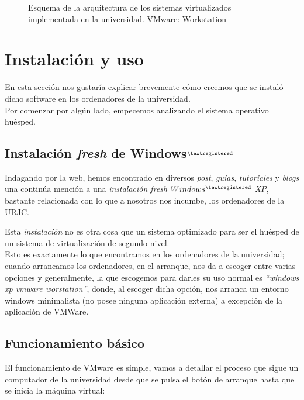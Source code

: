 \begin{figure}[H]
\begin{center}
\end{center}
\caption[Arquitectura VMware: Workstation]{Esquema de la arquitectura de los sistemas virtualizados implementada en la universidad. VMware: Workstation}
\end{figure}

\section{Instalación y uso}
En esta sección nos gustaría explicar brevemente cómo creemos que se instaló dicho software en los ordenadores de la universidad.\\

Por comenzar por algún lado, empecemos analizando el sistema operativo huésped\cite{vmwareinst}\cite{vmwareinst2}.\\

\subsection{Instalación \emph{fresh} de Windows$^{\textregistered}$}
Indagando por la web, hemos encontrado en diversos \emph{post}, \emph{guías}, \emph{tutoriales} y \emph{blogs} una continúa mención a una \emph{instalación fresh $Windows^{\textregistered}$ XP}, bastante relacionada con lo que a nosotros nos incumbe, los ordenadores de la URJC.

Esta \emph{instalación} no es otra cosa que un sistema optimizado para ser el huésped de un sistema de virtualización de segundo nivel.\\

Esto es exactamente lo que encontramos en los ordenadores de la universidad; cuando arrancamos los ordenadores, en el arranque, nos da a escoger entre varias opciones y generalmente, la que escogemos para darles su uso normal es \emph{\textquotedblleft windows xp vmware worstation\textquotedblright}, donde, al escoger dicha opción, nos arranca un entorno windows minimalista (no posee ninguna aplicación externa) a excepción de la aplicación de VMWare.

\subsection{Funcionamiento básico}

El funcionamiento de VMware es simple, vamos a detallar el proceso que sigue un computador de la universidad desde que se pulsa el botón de arranque hasta que se inicia la máquina virtual:

